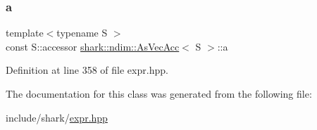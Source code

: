 \subsubsection{\texorpdfstring{a}{a}}
{\footnotesize\ttfamily template$<$typename S $>$ \\
const S\+::accessor \hyperlink{classshark_1_1ndim_1_1_as_vec_acc}{shark\+::ndim\+::\+As\+Vec\+Acc}$<$ S $>$\+::a\hspace{0.3cm}{\ttfamily [private]}}



Definition at line 358 of file expr.\+hpp.



The documentation for this class was generated from the following file\+:\begin{DoxyCompactItemize}
\item 
include/shark/\hyperlink{expr_8hpp}{expr.\+hpp}\end{DoxyCompactItemize}
